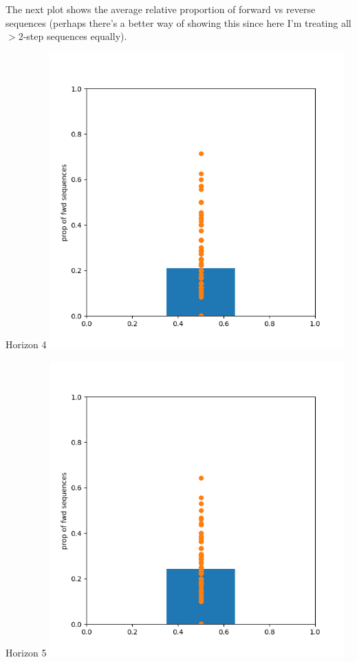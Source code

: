 \documentclass{article}
\begin{document}
The next plot shows the average relative proportion of forward vs reverse sequences (perhaps there's a better 
way of showing this since here I'm treating all $>2$-step sequences equally).

\vspace*{0.4cm}

\begin{minipage}{0.5\textwidth}
    \centering
    Horizon 4
    \includegraphics[width=0.85\textwidth]{../figures/hor5/fwd_rev_prop.png}
\end{minipage}%
\begin{minipage}{0.5\textwidth}
    \centering
    Horizon 5
    \includegraphics[width=0.85\textwidth]{../figures/hor6/fwd_rev_prop.png}
\end{minipage}
\end{document}
